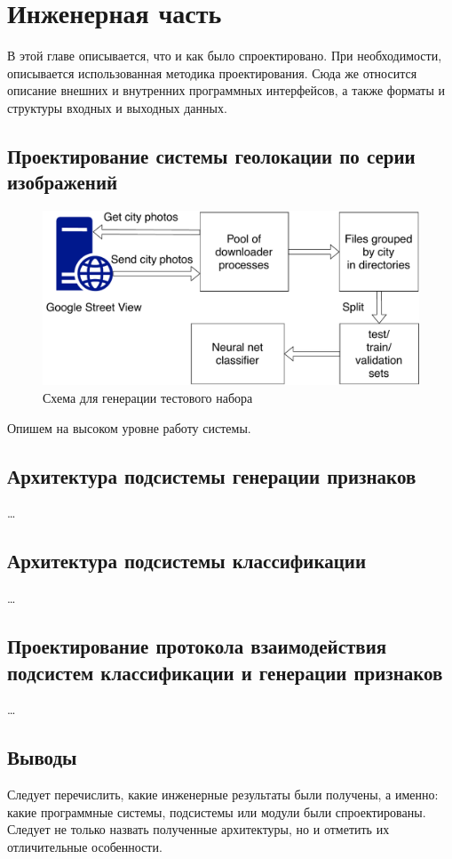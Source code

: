 \chapter{Инженерная часть}

В этой главе описывается, что и как было спроектировано. При необходимости, описывается использованная методика проектирования. Сюда же относится описание внешних и внутренних программных интерфейсов, а также форматы и структуры входных и выходных данных.


\section{Проектирование системы геолокации по серии изображений}

\begin{figure}[h]
	\centering
	\includegraphics[width=0.7\linewidth]{img/dataset_generation}
	\caption{Схема для генерации тестового набора}
	\label{fig:datasetgeneration}
\end{figure}

Опишем на высоком уровне работу системы.

\section{Архитектура подсистемы генерации признаков}

\dots


\section{Архитектура подсистемы классификации}

\dots


\section{
  Проектирование протокола взаимодействия подсистем 
  классификации и генерации признаков
}

\dots


\section{Выводы}

Следует перечислить, какие инженерные результаты были получены, а именно: 
какие программные системы, подсистемы или модули были спроектированы. Следует 
не только назвать полученные архитектуры, но и отметить их отличительные 
особенности.
